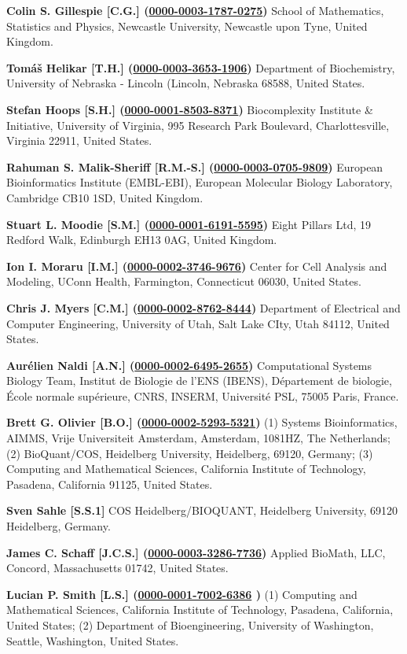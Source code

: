 \documentclass{sbml-paper}
\newcommand{\orcid}[1]{\href{https://orcid.org/#1}{#1}}
\begin{document}
\textbf{Colin S. Gillespie [C.G.] (\orcid{0000-0003-1787-0275})} School of Mathematics, Statistics and Physics, Newcastle University, Newcastle upon Tyne, United Kingdom.

\textbf{Tomáš Helikar [T.H.] (\orcid{0000-0003-3653-1906})} Department of Biochemistry, University of Nebraska - Lincoln (Lincoln, Nebraska 68588, United States.

\textbf{Stefan Hoops [S.H.] (\orcid{0000-0001-8503-8371})} Biocomplexity Institute \& Initiative, University of Virginia, 995 Research Park Boulevard, Charlottesville, Virginia 22911, United States.

\textbf{Rahuman S. Malik-Sheriff [R.M.-S.] (\orcid{0000-0003-0705-9809})} European Bioinformatics Institute (EMBL-EBI), European Molecular Biology Laboratory, Cambridge CB10 1SD, United Kingdom.

\textbf{Stuart L. Moodie [S.M.] (\orcid{0000-0001-6191-5595})} Eight Pillars Ltd, 19 Redford Walk, Edinburgh EH13 0AG, United Kingdom.

\textbf{Ion I. Moraru [I.M.] (\orcid{0000-0002-3746-9676})} Center for Cell Analysis and Modeling, UConn Health, Farmington, Connecticut 06030, United States.

\textbf{Chris J. Myers [C.M.] (\orcid{0000-0002-8762-8444})} Department of Electrical and Computer Engineering, University of Utah, Salt Lake CIty, Utah 84112, United States.

\textbf{Aurélien Naldi [A.N.] (\orcid{0000-0002-6495-2655})} Computational Systems Biology Team, Institut de Biologie de l’ENS (IBENS), Département de biologie, École normale supérieure, CNRS, INSERM, Université PSL, 75005 Paris, France.

\textbf{Brett G. Olivier [B.O.] (\orcid{0000-0002-5293-5321})} (1) Systems Bioinformatics, AIMMS, Vrije Universiteit Amsterdam, Amsterdam, 1081HZ, The Netherlands; (2) BioQuant/COS, Heidelberg University, Heidelberg, 69120, Germany; (3) Computing and Mathematical Sciences, California Institute of Technology, Pasadena, California 91125, United States.

\textbf{Sven Sahle [S.S.1]} COS Heidelberg/BIOQUANT,  Heidelberg University, 69120 Heidelberg, Germany.

\textbf{James C. Schaff [J.C.S.] (\orcid{0000-0003-3286-7736})} Applied BioMath, LLC, Concord, Massachusetts 01742, United States.

\textbf{Lucian P. Smith [L.S.] (\orcid{0000-0001-7002-6386} )} (1) Computing and Mathematical Sciences, California Institute of Technology, Pasadena, California, United States; (2) Department of Bioengineering, University of Washington, Seattle, Washington, United States.
\end{document}
